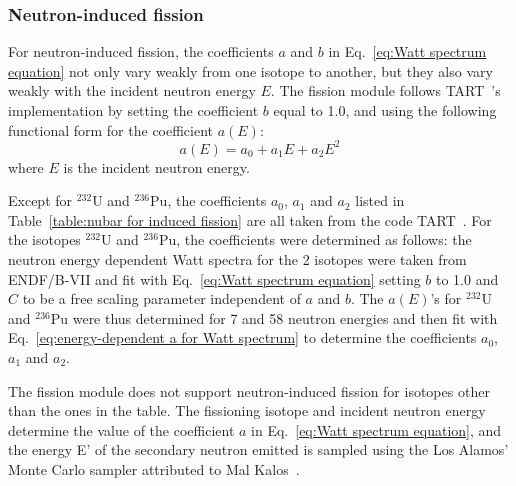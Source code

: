 \subsubsection*{Neutron-induced fission}
For neutron-induced fission, the coefficients $a$ and $b$ in
Eq.~\ref{eq:Watt spectrum equation} not only vary weakly from one 
isotope to another, but they also vary weakly with the incident 
neutron energy $E$. The fission module follows 
TART~\cite{TART 2003, Cullen 2004}'s implementation by setting 
the coefficient $b$ equal to 1.0, and using the following
functional form for the coefficient $a(E)$:
\begin{equation}
a(E) = a_0+a_1E+a_2E^2
\label{eq:energy-dependent a for Watt spectrum}
\end{equation}
where $E$ is the incident neutron energy.

Except for $^{232}$U and $^{236}$Pu, the coefficients 
$a_0$, $a_1$ and $a_2$ listed in Table~\ref{table:nubar for induced fission} 
are all taken from the code TART~\cite{TART 2003, Cullen 2004}. For the 
isotopes $^{232}$U and $^{236}$Pu, the coefficients were determined as
follows: the neutron energy dependent Watt spectra for the 2 isotopes 
were taken from ENDF/B-VII and fit with 
Eq.~\ref{eq:Watt spectrum equation} setting $b$ to 1.0 and $C$ 
to be a free scaling parameter independent of $a$ and $b$. 
The $a(E)$'s for $^{232}$U and $^{236}$Pu were thus determined for 7 and 58 
neutron energies and then fit with Eq.~\ref{eq:energy-dependent a for Watt spectrum}
to determine the coefficients $a_0$, $a_1$ and $a_2$.

The fission module does not support neutron-induced fission for 
isotopes other than the ones in the table. The fissioning 
isotope and incident neutron energy determine the value of 
the coefficient $a$ in Eq.~\ref{eq:Watt spectrum equation}, and 
the energy E' of the secondary neutron emitted is sampled 
using the Los Alamos' Monte Carlo sampler attributed to Mal 
Kalos~\cite{Everett 1983}.

